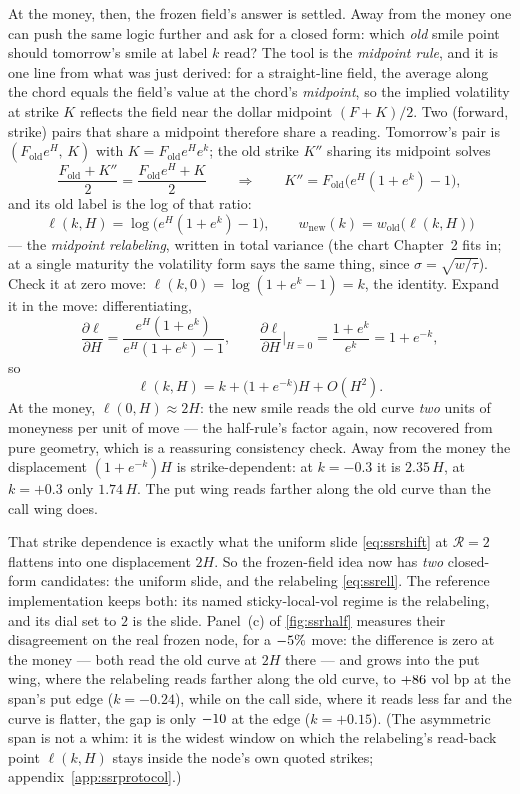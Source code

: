 At the money, then, the frozen field's answer is settled.  Away from
the money one can push the same logic further and ask for a closed
form: which \emph{old} smile point should tomorrow's smile at label
$k$ read?  The tool is the \emph{midpoint rule}, and it is one line
from what was just derived: for a straight-line field, the average
along the chord equals the field's value at the chord's
\emph{midpoint}, so the implied volatility at strike $K$ reflects the
field near the dollar midpoint $(F+K)/2$.  Two (forward, strike)
pairs that share a midpoint therefore share a reading.
Tomorrow's pair is $(F_{\mathrm{old}}e^{H},\,K)$ with
$K=F_{\mathrm{old}}e^{H}e^{k}$; the old strike $K''$ sharing its
midpoint solves
\[
\frac{F_{\mathrm{old}}+K''}{2}
=\frac{F_{\mathrm{old}}e^{H}+K}{2}
\qquad\Longrightarrow\qquad
K''=F_{\mathrm{old}}\big(e^{H}(1+e^{k})-1\big),
\]
and its old label is the log of that ratio:
\begin{equation}
\ell(k,H)=\log\!\big(e^{H}(1+e^{k})-1\big),
\qquad
w_{\mathrm{new}}(k)=w_{\mathrm{old}}\big(\ell(k,H)\big)
\label{eq:ssrell}
\end{equation}
--- the \emph{midpoint relabeling}, written in total variance (the
chart Chapter~2 fits in; at a single maturity the volatility form
says the same thing, since $\sigma=\sqrt{w/\tau}$).  Check
it at zero move: $\ell(k,0)=\log(1+e^{k}-1)=k$, the identity.  Expand
it in the move: differentiating,
\[
\frac{\partial\ell}{\partial H}
=\frac{e^{H}(1+e^{k})}{e^{H}(1+e^{k})-1},
\qquad
\frac{\partial\ell}{\partial H}\bigg|_{H=0}
=\frac{1+e^{k}}{e^{k}}
=1+e^{-k},
\]
so
\begin{equation}
\ell(k,H)=k+\big(1+e^{-k}\big)H+O(H^{2}) .
\label{eq:ssrellexp}
\end{equation}
At the money, $\ell(0,H)\approx 2H$: the new smile reads the old curve
\emph{two} units of moneyness per unit of move --- the half-rule's
factor again, now recovered from pure geometry, which is a
reassuring consistency check.  Away from the money the displacement
$(1+e^{-k})H$ is strike-dependent: at $k=-0.3$ it is $2.35\,H$, at
$k=+0.3$ only $1.74\,H$.  The put wing reads farther along the old
curve than the call wing does.

That strike dependence is exactly what the uniform slide
\eqref{eq:ssrshift} at $\mathcal{R}=2$ flattens into one displacement
$2H$.  So the frozen-field idea now has \emph{two} closed-form
candidates: the uniform slide, and the relabeling
\eqref{eq:ssrell}.  The reference implementation keeps both: its
named sticky-local-vol regime is the relabeling, and its dial set to
$2$ is the slide.  Panel~(c) of \cref{fig:ssrhalf} measures their
disagreement on the real frozen node, for a
$-5\%$ move: the difference is zero at the money
--- both read the old curve at $2H$ there --- and grows into the put
wing, where the relabeling reads farther along the old curve, to
$+86$ vol bp at the span's put edge ($k=-0.24$),
while on the call side, where it reads less far and the curve is
flatter, the gap is only $-10$ at the edge
($k=+0.15$).  (The
asymmetric span is not a whim: it is the widest window on which the
relabeling's read-back point $\ell(k,H)$ stays inside the node's own
quoted strikes; appendix~\ref{app:ssrprotocol}.)

